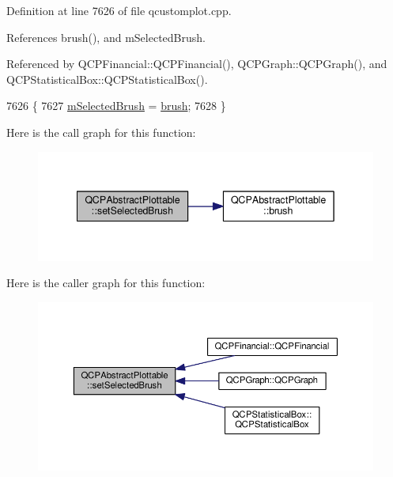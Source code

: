 Definition at line 7626 of file qcustomplot.\+cpp.



References brush(), and m\+Selected\+Brush.



Referenced by Q\+C\+P\+Financial\+::\+Q\+C\+P\+Financial(), Q\+C\+P\+Graph\+::\+Q\+C\+P\+Graph(), and Q\+C\+P\+Statistical\+Box\+::\+Q\+C\+P\+Statistical\+Box().


\begin{DoxyCode}
7626                                                                \{
7627   \hyperlink{class_q_c_p_abstract_plottable_aea3c0da30c7a8be23ad5f2d9bca36762}{mSelectedBrush} = \hyperlink{class_q_c_p_abstract_plottable_aa74cdceb9c7286ef116fbfa58e0326e7}{brush};
7628 \}
\end{DoxyCode}


Here is the call graph for this function\+:\nopagebreak
\begin{figure}[H]
\begin{center}
\leavevmode
\includegraphics[width=342pt]{class_q_c_p_abstract_plottable_ae8c816874089f7a44001e8618e81a9dc_cgraph}
\end{center}
\end{figure}




Here is the caller graph for this function\+:\nopagebreak
\begin{figure}[H]
\begin{center}
\leavevmode
\includegraphics[width=350pt]{class_q_c_p_abstract_plottable_ae8c816874089f7a44001e8618e81a9dc_icgraph}
\end{center}
\end{figure}


